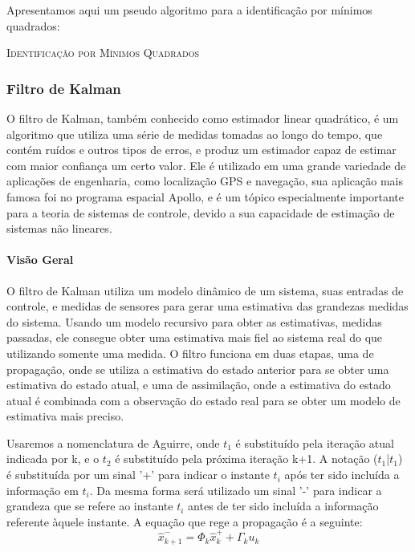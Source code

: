 Apresentamos aqui um pseudo algoritmo para a identificação por mínimos quadrados:

\IncMargin{1em}
\begin{algorithm}[H]

	\Retorna{$\theta$}
	\label{alg:mq}
	\caption{\textsc{Identificação por Mínimos Quadrados}}
\end{algorithm}
\DecMargin{1em}


\subsubsection {Filtro de Kalman}
O filtro de Kalman, também conhecido como estimador linear quadrático, é um algoritmo que utiliza uma série de medidas tomadas ao longo do tempo, que contém ruídos e outros tipos de erros, e produz um estimador capaz de estimar com maior confiança um certo valor. Ele é utilizado em uma grande variedade de aplicações de engenharia, como localização GPS e navegação, sua aplicação mais famosa foi no programa espacial Apollo, e é um tópico especialmente importante para a teoria de sistemas de controle, devido a sua capacidade de estimação de sistemas não lineares.
\paragraph{Visão Geral}
O filtro de Kalman utiliza um modelo dinâmico de um sistema, suas entradas de controle, e medidas de sensores para gerar uma estimativa das grandezas medidas do sistema. Usando um modelo recursivo para obter as estimativas, medidas passadas, ele consegue obter uma estimativa mais fiel ao sistema real do que utilizando somente uma medida. O filtro funciona em duas etapas, uma de propagação, onde se utiliza a estimativa do estado anterior para se obter uma estimativa do estado atual, e uma de assimilação, onde a estimativa do estado atual é combinada com a observação do estado real para se obter um modelo de estimativa mais preciso. 


Usaremos a nomenclatura de Aguirre, onde $t_1$ é substituído pela iteração atual indicada por k, e o $t_2$ é substituído pela próxima iteração k+1. A notação ($t_1$|$t_1$) é substituída por um sinal '+' para indicar o instante $t_i$ após ter sido incluída a informação em $t_i$. Da mesma forma será utilizado um sinal '-' para indicar a grandeza que se refere ao instante $t_i$ antes de ter sido incluída a informação referente àquele instante. A equação que rege a propagação é a seguinte:
\begin{equation} \label{eq:prop}
\hat{x}^{-}_{k+1}=\Phi_k \hat{x}^+_k+\Gamma_ku_k
\end{equation}

